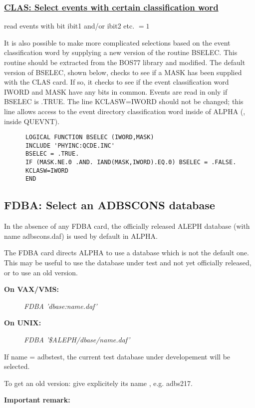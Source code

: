 \subsubsection{\underline{CLAS: Select events with certain classification word}}
\par
\begin{indentlist}{ 2.50cm}{ 2.75cm}
read events with bit ibit1 and/or ibit2 etc. $= 1$\end{indentlist}
\par
It is also possible to make more complicated selections
based on the event classification word by
supplying a new version of the routine BSELEC.  This routine
should be extracted from the BOS77 library and modified. The
default version of BSELEC, shown below, checks to see if
a MASK has been supplied with the CLAS card.  If so, it checks
to see if the event classification word IWORD and MASK have any
bits in common.  Events are read in only if BSELEC is .TRUE.
The line KCLASW=IWORD should not be changed;  this line allows access
to the event directory classification word inside of ALPHA
(\eg, inside QUEVNT).
\begin{verbatim}
      LOGICAL FUNCTION BSELEC (IWORD,MASK)
      INCLUDE 'PHYINC:QCDE.INC'
      BSELEC = .TRUE.
      IF (MASK.NE.0 .AND. IAND(MASK,IWORD).EQ.0) BSELEC = .FALSE.
      KCLASW=IWORD
      END
\end{verbatim}
\par
\subsection{\label{sec-DCFDBA}FDBA: Select an ADBSCONS database}
\par
In the absence of any FDBA card, the officially released ALEPH database (with name adbscons.daf)
 is used by default in ALPHA.
\par 
The FDBA card directs ALPHA to use a database which is not the default one.
This may be useful to use the database under test and not yet officially released, or to use
an old version.
\begin{description}
\item[\bf{On VAX/VMS:}]{\it FDBA 'dbase:name.daf'}
\item[\bf{On UNIX:}]{\it FDBA '\$ALEPH/dbase/name.daf'}
\end{description}
\par If name = adbstest, the current test database under developement will be selected.
\par To get an old version: give explicitely its name , e.g.  adbs217.
\par {\bf Important remark:}
 
